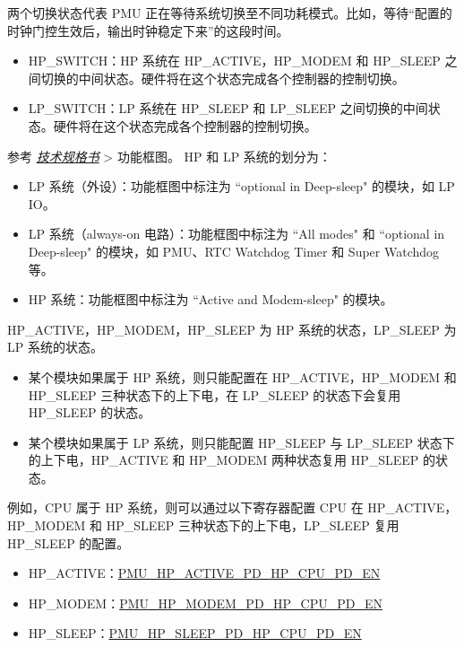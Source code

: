 \documentclass[main\_\_CN.tex]{subfiles}
\begin{document}
两个切换状态代表 PMU 正在等待系统切换至不同功耗模式。比如，等待“配置的时钟门控生效后，输出时钟稳定下来”的这段时间。
\begin{itemize}
    \item HP\_SWITCH：HP 系统在 HP\_ACTIVE，HP\_MODEM 和 HP\_SLEEP 之间切换的中间状态。硬件将在这个状态完成各个控制器的控制切换。
    \item LP\_SWITCH：LP 系统在 HP\_SLEEP 和 LP\_SLEEP 之间切换的中间状态。硬件将在这个状态完成各个控制器的控制切换。
\end{itemize}
\begin{tiplisting}
    参考 \textit{\href{https://www.espressif.com/sites/default/files/documentation/esp32-c61_datasheet_cn.pdf}{\chipname{} 技术规格书}} > 功能框图。
    HP 和 LP 系统的划分为：
    \begin{itemize}
    \item LP 系统（外设）：功能框图中标注为 ``optional in Deep-sleep" 的模块，如 LP IO。
    \item LP 系统（always-on 电路）：功能框图中标注为 ``All modes" 和 ``optional in Deep-sleep" 的模块，如 PMU、RTC Watchdog Timer 和 Super Watchdog 等。
    \item HP 系统：功能框图中标注为 ``Active and Modem-sleep" 的模块。
    \end{itemize}
\end{tiplisting}

HP\_ACTIVE，HP\_MODEM，HP\_SLEEP 为 HP 系统的状态，LP\_SLEEP 为 LP 系统的状态。
\begin{itemize}
    \item 某个模块如果属于 HP 系统，则只能配置在 HP\_ACTIVE，HP\_MODEM 和 HP\_SLEEP 三种状态下的上下电，在 LP\_SLEEP 的状态下会复用 HP\_SLEEP 的状态。
    \item 某个模块如果属于 LP 系统，则只能配置 HP\_SLEEP 与 LP\_SLEEP 状态下的上下电，HP\_ACTIVE 和 HP\_MODEM 两种状态复用 HP\_SLEEP 的状态。
\end{itemize}

例如，CPU 属于 HP 系统，则可以通过以下寄存器配置 CPU 在 HP\_ACTIVE，HP\_MODEM 和 HP\_SLEEP 三种状态下的上下电，LP\_SLEEP 复用 HP\_SLEEP 的配置。

\begin{itemize}
    \item HP\_ACTIVE：\hyperref[fielddesc:PMUHPACTIVEPDHPCPUPDEN]{PMU\_HP\_ACTIVE\_PD\_HP\_CPU\_PD\_EN}
    \item HP\_MODEM：\hyperref[fielddesc:PMUHPMODEMPDHPCPUPDEN]{PMU\_HP\_MODEM\_PD\_HP\_CPU\_PD\_EN}
    \item HP\_SLEEP：\hyperref[fielddesc:PMUHPSLEEPPDHPCPUPDEN]{PMU\_HP\_SLEEP\_PD\_HP\_CPU\_PD\_EN}
\end{itemize}
\end{document}
